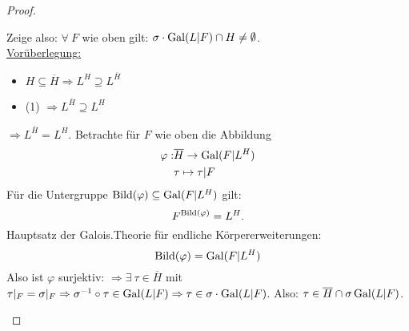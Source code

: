 \begin{proof}
\begin{enumerate}[(1)]
Zeige also: $\forall \ F$ wie oben gilt: $\sigma \cdot \operatorname{Gal}(L|F) \cap H \neq \emptyset$.\\
\underline{Vorüberlegung:} \begin{itemize}
\item $H \subseteq \overline{H} \Rightarrow L^H \supseteq L^{\overline{H}}$
\item (1) $\Rightarrow L^{\overline{H}} \supseteq L^H$
\end{itemize}
$\Rightarrow L^{\overline{H}}=L^H.$
Betrachte für $F$ wie oben die Abbildung
\begin{align*}
\varphi: &\overline{H} \to \operatorname{Gal}(F|L^H)\\
&\tau \mapsto \tau|F
\end{align*}
Für die Untergruppe $\operatorname{Bild}(\varphi) \subseteq \operatorname{Gal}(F |L^H)$ gilt:
\[F^{\operatorname{Bild}(\varphi)} = L^H.\]
Hauptsatz der Galois.Theorie für endliche Körpererweiterungen:
\[\operatorname{Bild}(\varphi)=\operatorname{Gal}(F|L^H)\]
Also ist $\varphi$ surjektiv: $\Rightarrow \exists \ \tau \in \overline{H}$ mit $\tau|_F = \sigma|_F \Rightarrow \sigma^{-1}\circ \tau \in \operatorname{Gal}(L|F) \Rightarrow \tau \in \sigma \cdot \operatorname{Gal}(L|F)$. Also: $\tau \in \overline{H} \cap \sigma \operatorname{Gal}(L|F)$.
\end{enumerate}
\end{proof}